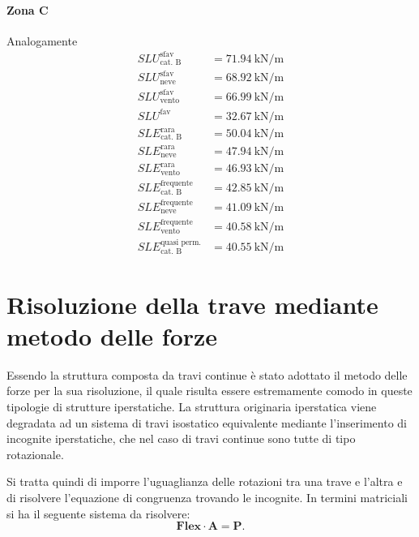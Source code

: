 \paragraph*{Zona C} Analogamente
\begin{align*} 
	SLU^{\text{sfav}}_{\text{cat. B}}		&= \SI{71.94}{\kilo\newton\per\meter} \\
	SLU^{\text{sfav}}_{\text{neve}} 		&= \SI{68.92}{\kilo\newton\per\meter} \\
	SLU^{\text{sfav}}_{\text{vento}} 		&= \SI{66.99}{\kilo\newton\per\meter} \\
	SLU^{\text{fav}} 						&= \SI{32.67}{\kilo\newton\per\meter} \\	
	SLE^{\text{rara}}_{\text{cat. B}} 		&= \SI{50.04}{\kilo\newton\per\meter} \\
	SLE^{\text{rara}}_{\text{neve}}			&= \SI{47.94}{\kilo\newton\per\meter} \\
	SLE^{\text{rara}}_{\text{vento}} 		&= \SI{46.93}{\kilo\newton\per\meter} \\
	SLE^{\text{frequente}}_{\text{cat. B}} 	&= \SI{42.85}{\kilo\newton\per\meter} \\
	SLE^{\text{frequente}}_{\text{neve}} 	&= \SI{41.09}{\kilo\newton\per\meter} \\
	SLE^{\text{frequente}}_{\text{vento}} 	&= \SI{40.58}{\kilo\newton\per\meter} \\
	SLE^{\text{quasi perm.}}_{\text{cat. B}}&= \SI{40.55}{\kilo\newton\per\meter}
\end{align*}

\section{Risoluzione della trave mediante metodo delle forze}
Essendo la struttura composta da travi continue è stato adottato il metodo delle forze per la sua risoluzione, il quale risulta essere estremamente comodo in queste tipologie di strutture iperstatiche.
La struttura originaria iperstatica viene degradata ad un sistema di travi isostatico equivalente mediante l'inserimento di incognite iperstatiche, che nel caso di travi continue sono tutte di tipo rotazionale.

Si tratta quindi di imporre l'uguaglianza delle rotazioni tra una trave e l'altra e di risolvere l'equazione di congruenza trovando le incognite.
In termini matriciali si ha il seguente sistema da risolvere:
\begin{equation}
\mathbf{Flex}\cdot\mathbf{A} =  \mathbf{P}.
\end{equation}

